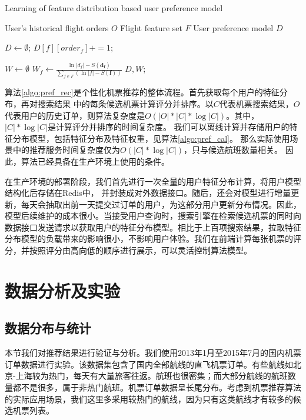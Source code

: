 \begin{algorithm}[!h]
\caption{Learning of feature distribution based user preference model}
\label{algo:pref_cal}
\begin{algorithmic}[1]
\Require
\Statex User's historical flight orders $O$
\Statex Flight feature set $F$
\Ensure
\Statex User preference model $D$

\State $D \gets \emptyset$;
\State $D[f][order_f] += 1$;
\EndFor	
\EndFor 

\State $W \gets \emptyset$
\State $W_f \gets \frac{\ln |d_f| - S(\mathbf{d_f})}{\sum_{f \in F}(\ln |f| - S(\mathbf{f}))}$
\EndFor
\State \Return $D,W$;
\EndFunction

\end{algorithmic}
\end{algorithm}


算法\ref{algo:pref_rec}是个性化机票推荐的整体流程。首先获取每个用户的特征分布，再对搜索结果
中的每条候选机票计算评分并排序。以$C$代表机票搜索结果，$O$代表用户的历史订单，则算法复杂度是$O(|O|*|C|*\log|C|)$。其中，$|C|*\log|C|$是计算评分并排序的时间复杂度。
我们可以离线计算并存储用户的特征分布模型，包括特征分布及特征权重，见算法\ref{algo:pref_cal}。
那么实际使用场景中的推荐服务时间复杂度仅为$O(|C|*\log|C|)$，只与候选航班数量相关。
因此，算法已经具备在生产环境上使用的条件。

在生产环境的部署阶段，我们首先进行一次全量的用户特征分布计算，将用户模型结构化后存储在Redis中，
并封装成对外数据接口。随后，还会对模型进行增量更新，每天会抽取出前一天提交过订单的用户，为这部分用户更新分布情况。因此，模型后续维护的成本很小。当接受用户查询时，搜索引擎在检索候选机票的同时向数据接口发送请求以获取用户的特征分布模型。相比于上百项搜索结果，拉取特征分布模型的负载带来的影响很小，不影响用户体验。我们在前端计算每张机票的评分，并按照评分由高向低的顺序进行展示，可以灵活控制算法模型。

\section{数据分析及实验}

\subsection{数据分布与统计}
本节我们对推荐结果进行验证与分析。我们使用2013年1月至2015年7月的国内机票订单数据进行实验。该数据集包含了国内全部航线的直飞机票订单。有些航线如北京-上海较为热门，每天有大量旅客往返。航班也很密集；而大部分航线的航班数量都不是很多，属于非热门航班。机票订单数据呈长尾分布。考虑到机票推荐算法的实际应用场景，我们这里多采用较热门的航线，因为只有这类航线才有较多的候选机票列表。

